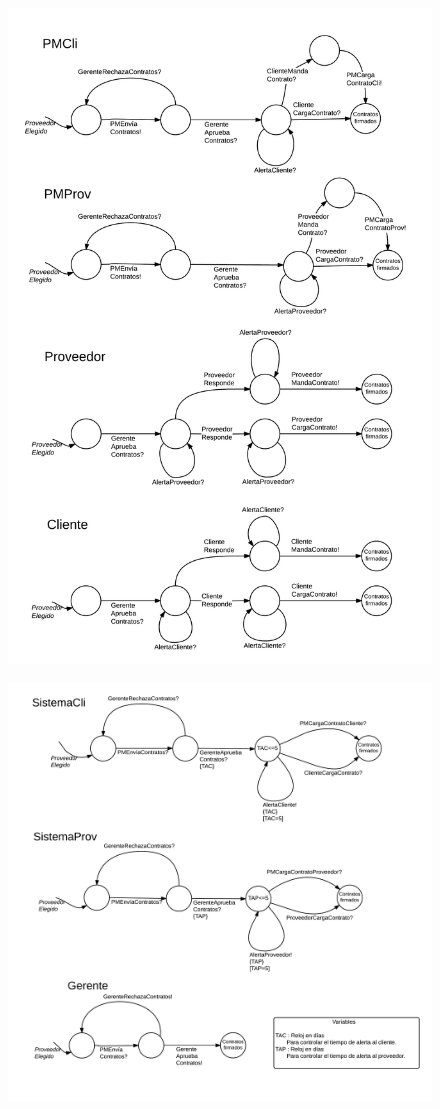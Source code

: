 \begin{figure}[H]
\centering
\includegraphics[width=0.8\linewidth]{diag/nuevos/fsm-firmcont1.png}
\label{fsm-firmcont1}
\end{figure}

\begin{figure}[H]
\centering
\includegraphics[width=0.8\linewidth]{diag/nuevos/fsm-firmcont2.png}
\label{fsm-firmcont2}
\end{figure}



